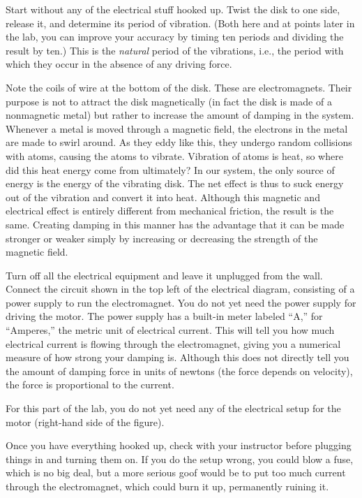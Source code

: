 \observations


Start without any of the electrical stuff hooked up. Twist
the disk to one side, release it, and determine its period
of vibration. (Both here and at points later in the lab, you
can improve your accuracy by timing ten periods and dividing
the result by ten.) This is the \emph{natural} period of the
vibrations, i.e., the period with which they occur in the
absence of any driving force.


Note the coils of wire at the bottom of the disk. These are
electromagnets. Their purpose is not to attract the disk
magnetically (in fact the disk is made of a nonmagnetic
metal) but rather to increase the amount of damping in the
system. Whenever a metal is moved through a magnetic field,
the electrons in the metal are made to swirl around. As they
eddy like this, they undergo random collisions with atoms,
causing the atoms to vibrate. Vibration of atoms is heat, so
where did this heat energy come from ultimately? In our
system, the only source of energy is the energy of the
vibrating disk. The net effect is thus to suck energy out of
the vibration and convert it into heat. Although this
magnetic and electrical effect is entirely different from
mechanical friction, the result is the same. Creating
damping in this manner has the advantage that it can be made
stronger or weaker simply by increasing or decreasing the
strength of the magnetic field.

Turn off all the electrical equipment and leave it
unplugged from the wall. Connect the circuit shown in the top left of the
electrical diagram, consisting of a power supply to run the
electromagnet. You do not yet need the power
supply for driving the motor. The power supply has a built-in meter labeled ``A,'' for ``Amperes,''
the metric
unit of electrical current.
This will tell you how
much electrical current is flowing through the electromagnet,
giving you a numerical measure of how strong your
damping is. Although this does not directly
tell you the amount of damping force in units of newtons
(the force depends on velocity), the force is proportional to the current.

For this part of the lab, you do not yet need any of the electrical setup
for the motor (right-hand side of the figure).

Once you have everything hooked up, check with your
instructor before plugging things in and turning them on. If
you do the setup wrong, you could blow a fuse, which is no
big deal, but a more serious goof would be to put too much
current through the electromagnet, which could burn it up,
permanently ruining it.

